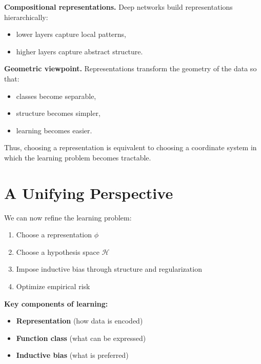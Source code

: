 \medskip

\noindent
\textbf{Compositional representations.}  
Deep networks build representations hierarchically:
\begin{itemize}
    \item lower layers capture local patterns,
    \item higher layers capture abstract structure.
\end{itemize}

\medskip

\noindent
\textbf{Geometric viewpoint.}  
Representations transform the geometry of the data so that:
\begin{itemize}
    \item classes become separable,
    \item structure becomes simpler,
    \item learning becomes easier.
\end{itemize}

\medskip

Thus, choosing a representation is equivalent to choosing a coordinate system in which the learning problem becomes tractable.

\section{A Unifying Perspective}

We can now refine the learning problem:

\begin{enumerate}
    \item Choose a representation $\phi$
    \item Choose a hypothesis space $\mathcal{H}$
    \item Impose inductive bias through structure and regularization
    \item Optimize empirical risk
\end{enumerate}

\medskip

\noindent
\textbf{Key components of learning:}
\begin{itemize}
    \item \textbf{Representation} (how data is encoded)
    \item \textbf{Function class} (what can be expressed)
    \item \textbf{Inductive bias} (what is preferred)
\end{itemize}

\medskip

